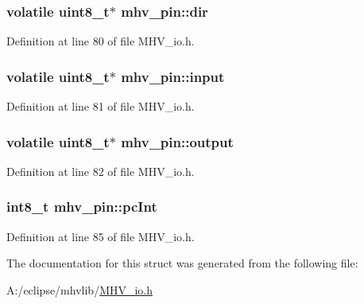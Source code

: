 \hypertarget{structmhv__pin_af92bee18d70be924e19ce2d2a6a7b14c}{
\subsubsection[{dir}]{\setlength{\rightskip}{0pt plus 5cm}volatile uint8\-\_\-t$\ast$ {\bf mhv\-\_\-pin\-::dir}}}
\label{structmhv__pin_af92bee18d70be924e19ce2d2a6a7b14c}


\-Definition at line 80 of file \-M\-H\-V\-\_\-io.\-h.

\hypertarget{structmhv__pin_a7c545d8bf340b11c799df9bc2c998076}{
\subsubsection[{input}]{\setlength{\rightskip}{0pt plus 5cm}volatile uint8\-\_\-t$\ast$ {\bf mhv\-\_\-pin\-::input}}}
\label{structmhv__pin_a7c545d8bf340b11c799df9bc2c998076}


\-Definition at line 81 of file \-M\-H\-V\-\_\-io.\-h.

\hypertarget{structmhv__pin_a5c5f34f91b6586d0603e9568900f8423}{
\subsubsection[{output}]{\setlength{\rightskip}{0pt plus 5cm}volatile uint8\-\_\-t$\ast$ {\bf mhv\-\_\-pin\-::output}}}
\label{structmhv__pin_a5c5f34f91b6586d0603e9568900f8423}


\-Definition at line 82 of file \-M\-H\-V\-\_\-io.\-h.

\hypertarget{structmhv__pin_a10252efa71e71a7e0e5ddb1d184c7101}{
\subsubsection[{pc\-Int}]{\setlength{\rightskip}{0pt plus 5cm}int8\-\_\-t {\bf mhv\-\_\-pin\-::pc\-Int}}}
\label{structmhv__pin_a10252efa71e71a7e0e5ddb1d184c7101}


\-Definition at line 85 of file \-M\-H\-V\-\_\-io.\-h.



\-The documentation for this struct was generated from the following file\-:\begin{DoxyCompactItemize}
\item 
\-A\-:/eclipse/mhvlib/\hyperlink{_m_h_v__io_8h}{\-M\-H\-V\-\_\-io.\-h}\end{DoxyCompactItemize}
